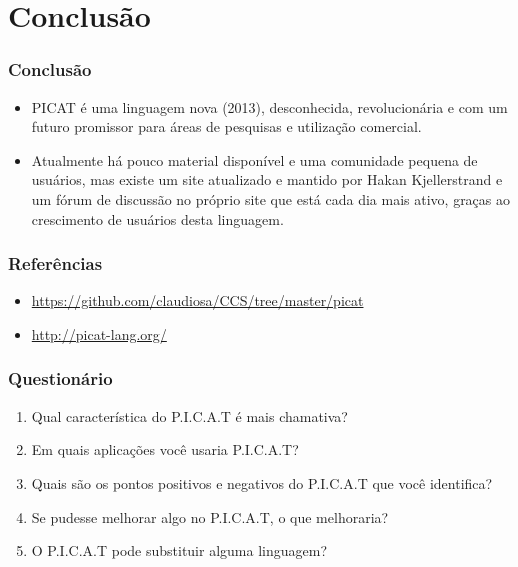 \documentclass{beamer}
\begin{document}

\section{Conclusão}
\begin{frame}
    \frametitle{Conclusão}
    \begin{itemize}
    \item PICAT é uma linguagem nova (2013), desconhecida, revolucionária e com um futuro promissor para áreas de pesquisas e utilização comercial.
    \item Atualmente há pouco material disponível e uma comunidade pequena de usuários, 
    mas existe um site atualizado e mantido por Hakan Kjellerstrand e um fórum de discussão no próprio site que está cada dia mais ativo, 
    graças ao crescimento de usuários desta linguagem.
    \end{itemize}
\end{frame}


\begin{frame}
    \frametitle{Referências}
    \begin{itemize}
     \item \url{https://github.com/claudiosa/CCS/tree/master/picat}
     \item \url{http://picat-lang.org/}
    \end{itemize}
\end{frame}


\begin{frame}
    \frametitle{Questionário}
    \begin{enumerate}
     \item Qual característica do P.I.C.A.T é mais chamativa?
     \item Em quais aplicações você usaria P.I.C.A.T?
     \item Quais são os pontos positivos e negativos do P.I.C.A.T que você identifica?
     \item Se pudesse melhorar algo no P.I.C.A.T, o que melhoraria?
     \item O P.I.C.A.T pode substituir alguma linguagem?
    \end{enumerate}
\end{frame}
\end{document}
